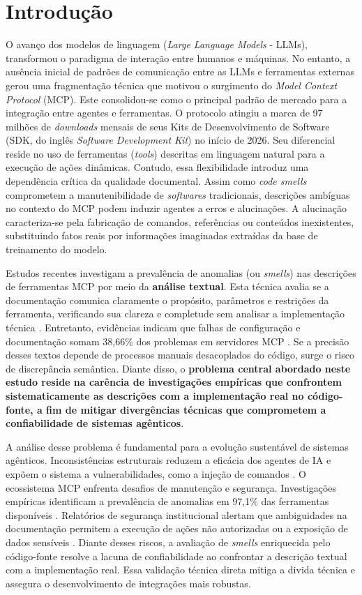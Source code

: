 

\section{Introdução}
\label{sec:introducao}
O avanço dos modelos de linguagem (\textit{Large Language Models} - LLMs), transformou o paradigma de interação entre humanos e máquinas. No entanto, a ausência inicial de padrões de comunicação entre as LLMs e ferramentas externas gerou uma fragmentação técnica que motivou o surgimento do \textit{Model Context Protocol} (MCP). Este consolidou-se como o principal padrão de mercado para a integração entre agentes e ferramentas. O protocolo atingiu a marca de 97 milhões de \textit{downloads} mensais de seus Kits de Desenvolvimento de Software (SDK, do inglês \textit{Software Development Kit}) no início de 2026. Seu diferencial reside no uso de ferramentas (\textit{tools}) descritas em linguagem natural para a execução de ações dinâmicas. Contudo, essa flexibilidade introduz uma dependência crítica da qualidade documental. Assim como \textit{code smells} comprometem a manutenibilidade de \textit{softwares} tradicionais, descrições ambíguas no contexto do MCP podem induzir agentes a erros e alucinações. A alucinação caracteriza-se pela fabricação de comandos, referências ou conteúdos inexistentes, substituindo fatos reais por informações imaginadas extraídas da base de treinamento do modelo.

Estudos recentes investigam a prevalência de anomalias (ou \textit{smells}) nas descrições de ferramentas MCP por meio da \textbf{análise textual}. Esta técnica avalia se a documentação comunica claramente o propósito, parâmetros e restrições da ferramenta, verificando sua clareza e completude sem analisar a implementação técnica \cite{mcpAtFirstGlance}. Entretanto, evidências indicam que falhas de configuração e documentação somam 38,66\% dos problemas em servidores MCP \cite{Taraghi2026}. Se a precisão desses textos depende de processos manuais desacoplados do código, surge o risco de discrepância semântica. Diante disso, o \textbf{problema central abordado neste estudo reside na carência de investigações empíricas que confrontem sistematicamente as descrições com a implementação real no código-fonte, a fim de mitigar divergências técnicas que comprometem a confiabilidade de sistemas agênticos}.

A análise desse problema é fundamental para a evolução sustentável de sistemas agênticos. Inconsistências estruturais reduzem a eficácia dos agentes de IA e expõem o sistema a vulnerabilidades, como a injeção de comandos \cite{Taraghi2026}. O ecossistema MCP enfrenta desafios de manutenção e segurança. Investigações empíricas identificam a prevalência de anomalias em 97,1\% das ferramentas disponíveis \cite{mcpAtFirstGlance}. Relatórios de segurança institucional alertam que ambiguidades na documentação permitem a execução de ações não autorizadas ou a exposição de dados sensíveis \cite{NSA2026}. Diante desses riscos, a avaliação de \textit{smells} enriquecida pelo código-fonte resolve a lacuna de confiabilidade ao confrontar a descrição textual com a implementação real. Essa validação técnica direta mitiga a divida técnica e assegura o desenvolvimento de integrações mais robustas.

